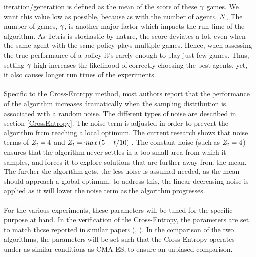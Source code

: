 iteration/generation is defined as the mean of the score of these 
$\gamma$ games.
We want this value low as possible, because as with the number of
agents, $N$, The number of games, $\gamma$, 
is another major factor which 
impacts the run-time of the algorithm.
As Tetris is stochastic by nature, the score deviates a lot, 
even when the
same agent with the same policy plays multiple games. 
Hence, when assessing the true
performance of a policy it's rarely enough to play just few games. Thus, setting 
$\gamma$ high increases the likelihood of correctly choosing the best 
agents, yet, it also causes longer run times of the experiments.\\
\\
Specific to the Cross-Entropy method, 
most authors report that the performance of the 
algorithm increases dramatically when the sampling 
distribution is associated with
a random noise. The different types of 
noise are described in section \ref{CrossEntropy}.
The noise term is adjusted in order to 
prevent the algorithm from reaching a local optimum.
The current research shows that noise terms of $Z_t = 4$ and 
$Z_t = max \left( 5 - t / 10 \right)$ \citep{thiery:09}.
The constant noise (such as $Z_t = 4$) ensures that the algorithm
never settles in a too small area from which it samples, and forces it to explore
solutions that are further away from the mean. The further the algorithm gets, 
the less noise is assumed needed, as the mean should approach a global optimum. to
address this, the linear decreasing noise 
is applied as it will lower the noise term
as the algorithm progresses.\\
\\
For the various experiments, these 
parameters will be tuned for the specific purpose 
at hand. In the verification of the Cross-Entropy, the parameters are set 
to match those reported in similar papers (\cite{thiery:09}, \cite{szita:06}).
In the comparison of the two algorithms, the parameters will be set such that 
the Cross-Entropy operates under as 
similar conditions as CMA-ES, to ensure an unbiased 
comparison.


